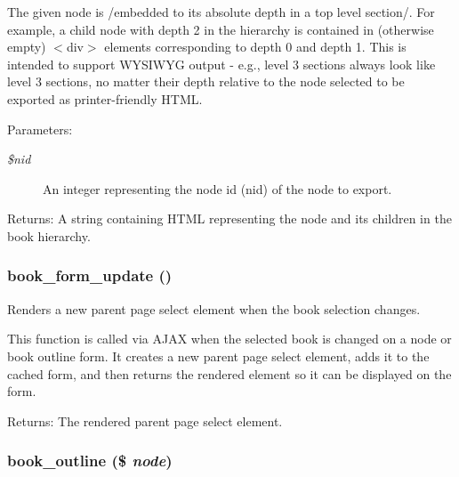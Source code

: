 The given node is /embedded to its absolute depth in a top level section/. For example, a child node with depth 2 in the hierarchy is contained in (otherwise empty) $<$div$>$ elements corresponding to depth 0 and depth 1. This is intended to support WYSIWYG output - e.g., level 3 sections always look like level 3 sections, no matter their depth relative to the node selected to be exported as printer-friendly HTML.

\begin{Desc}
\item[Parameters:]
\begin{description}
\item[{\em \$nid}]An integer representing the node id (nid) of the node to export. \end{description}
\end{Desc}
\begin{Desc}
\item[Returns:]A string containing HTML representing the node and its children in the book hierarchy. \end{Desc}
\hypertarget{book_8pages_8inc_5f3bce32bdc732757f2a6410bef6ce98}{
\subsubsection[{book\_\-form\_\-update}]{\setlength{\rightskip}{0pt plus 5cm}book\_\-form\_\-update ()}}
\label{book_8pages_8inc_5f3bce32bdc732757f2a6410bef6ce98}


Renders a new parent page select element when the book selection changes.

This function is called via AJAX when the selected book is changed on a node or book outline form. It creates a new parent page select element, adds it to the cached form, and then returns the rendered element so it can be displayed on the form.

\begin{Desc}
\item[Returns:]The rendered parent page select element. \end{Desc}
\hypertarget{book_8pages_8inc_13983b7dd1920acb58635a7784c719b1}{
\subsubsection[{book\_\-outline}]{\setlength{\rightskip}{0pt plus 5cm}book\_\-outline (\$ {\em node})}}
\label{book_8pages_8inc_13983b7dd1920acb58635a7784c719b1}


